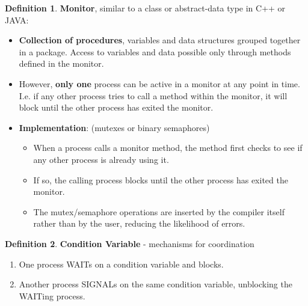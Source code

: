 \documentclass[11pt,a4paper]{article}
\theoremstyle{definition}
\newtheorem{definition}{Definition}[section]
\newenvironment{myitemize}
{ \begin{itemize}
    \setlength{\itemsep}{5pt}
    \setlength{\parskip}{0pt}
    \setlength{\parsep}{0pt}     }
{ \end{itemize}                  }
\newenvironment{myenumerate}
{ \begin{enumerate}
    \setlength{\itemsep}{5pt}
    \setlength{\parskip}{0pt}
    \setlength{\parsep}{0pt}     }
{ \end{enumerate}                }
\begin{document}
\begin{definition}{\textbf{Monitor}}, similar to a class or abstract-data type in C++ or JAVA:
	\begin{myitemize}
		\item \textbf{Collection of procedures}, variables and data structures grouped together in a package. Access to variables and data possible only through methods defined in the monitor.
		\item However, \textbf{only one} process can be active in a monitor at any point in time. I.e. if any other process tries to call a method within the monitor, it will block until the other process has exited the monitor.
		\item \textbf{Implementation}: (mutexes or binary semaphores)
		\begin{myitemize}
			\item When a process calls a monitor method, the method first checks to see if any other process is already using it. 
			\item If so, the calling process blocks until the other process has exited the monitor.
			\item The mutex/semaphore operations are inserted by the compiler itself rather than by the user, reducing the likelihood of errors.
		\end{myitemize}
	\end{myitemize}
\end{definition}

\begin{definition}{\textbf{Condition Variable} - mechanisms for coordination}
	\begin{myenumerate}
		\item One process WAITs on a condition variable and blocks.
		\item Another process SIGNALs on the same condition variable, unblocking the WAITing process.
	\end{myenumerate}
\end{definition}
\end{document}
